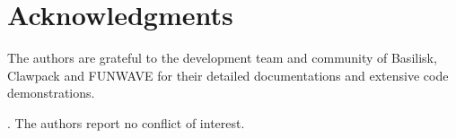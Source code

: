 \documentclass{jfm}
\begin{document}

\section*{Acknowledgments}
The authors are grateful to the development team and community of Basilisk, Clawpack and FUNWAVE for their detailed documentations and extensive code demonstrations.


. The authors report no conflict of interest. \\



\end{document}
